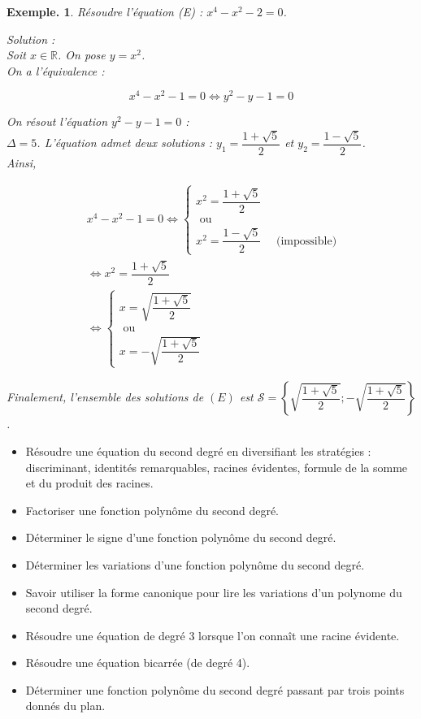 \documentclass[12pt]{article}
\theoremstyle{break}
\newtheorem*{example}{Exemple.}
\begin{document}
\begin{example}
    Résoudre l'équation (E) : $x^{4}-x^{2}-2=0$.

Solution :\\
Soit $x \in \mathbb{R}$. On pose $y=x^{2}$.\\
On a l'équivalence :

$$
x^{4}-x^{2}-1=0 \Longleftrightarrow y^{2}-y-1=0
$$

On résout l'équation $y^{2}-y-1=0$ :\\
$\Delta=5$. L'équation admet deux solutions : $y_{1}=\dfrac{1+\sqrt{5}}{2}$ et $y_{2}=\dfrac{1-\sqrt{5}}{2}$.\\
Ainsi,

$$
\begin{aligned}
& x^{4}-x^{2}-1=0 \Longleftrightarrow\left\{\begin{array}{l}
x^{2}=\dfrac{1+\sqrt{5}}{2} \\
\text { ou } \\
x^{2}=\dfrac{1-\sqrt{5}}{2} \quad \text { (impossible) }
\end{array}\right. \\
& \Longleftrightarrow x^{2}=\dfrac{1+\sqrt{5}}{2} \\
& \Longleftrightarrow\left\{\begin{array}{l}
x=\sqrt{\dfrac{1+\sqrt{5}}{2}} \\
\text { ou } \\
x=-\sqrt{\dfrac{1+\sqrt{5}}{2}}
\end{array}\right.
\end{aligned}
$$

Finalement, l'ensemble des solutions de $(E)$ est $\mathcal{S}=\left\{\sqrt{\dfrac{1+\sqrt{5}}{2}} ;-\sqrt{\dfrac{1+\sqrt{5}}{2}}\right\}$.
\end{example}

\newpage
\begin{savoir}{}{}

\begin{itemize}
  \item Résoudre une équation du second degré en diversifiant les stratégies : discriminant, identités remarquables, racines évidentes, formule de la somme et du produit des racines.
  \item Factoriser une fonction polynôme du second degré.
  \item Déterminer le signe d'une fonction polynôme du second degré.
  \item Déterminer les variations d'une fonction polynôme du second degré.
  \item Savoir utiliser la forme canonique pour lire les variations d'un polynome du second degré.
  \item Résoudre une équation de degré 3 lorsque l'on connaît une racine évidente.
  \item Résoudre une équation bicarrée (de degré 4).
  \item Déterminer une fonction polynôme du second degré passant par trois points donnés du plan.
\end{itemize}

\end{savoir}
\end{document}

